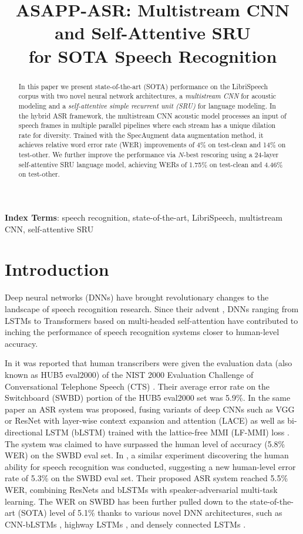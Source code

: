 \documentclass[a4paper]{article}
\title{ASAPP-ASR: Multistream CNN and Self-Attentive SRU\\for SOTA Speech Recognition}
\begin{document}
\maketitle
\begin{abstract}
In this paper we present state-of-the-art (SOTA) performance on the LibriSpeech corpus with two novel neural network architectures, a \textit{multistream CNN} for acoustic modeling and a \textit{self-attentive simple recurrent unit (SRU)} for language modeling. In the hybrid ASR framework, the multistream CNN acoustic model processes an input of speech frames in multiple parallel pipelines where each stream has a unique dilation rate for diversity. Trained with the SpecAugment data augmentation method, it achieves relative word error rate (WER) improvements of 4\% on test-clean and 14\% on test-other. We further improve the performance via $N$-best rescoring using a 24-layer self-attentive SRU language model, achieving WERs of 1.75\% on test-clean and 4.46\% on test-other.   
\end{abstract}
\noindent\textbf{Index Terms}: speech recognition, state-of-the-art, LibriSpeech, multistream CNN, self-attentive SRU

\section{Introduction}
Deep neural networks (DNNs) have brought revolutionary changes to the landscape of speech recognition research. Since their advent \cite{Hinton12}, DNNs ranging from LSTMs \cite{Hochreiter97} to Transformers based on multi-headed self-attention \cite{vaswani} have contributed to inching the performance of speech recognition systems closer to human-level accuracy. 

In \cite{Xiong16-2} it was reported that human transcribers were given the evaluation data (also known as HUB5 eval2000) of the NIST 2000 Evaluation Challenge of Conversational Telephone Speech (CTS) \cite{William00}. Their average error rate on the Switchboard (SWBD) portion of the HUB5 eval2000 set was 5.9\%. In the same paper an ASR system was proposed, fusing variants of deep CNNs such as VGG \cite{simoyan14} or ResNet \cite{He16} with layer-wise context expansion and attention (LACE) \cite{yu16} as well as bi-directional LSTM (bLSTM) trained with the lattice-free MMI (LF-MMI) loss \cite{Povey16}. The system was claimed to have surpassed the human level of accuracy (5.8\% WER) on the SWBD eval set. In \cite{Saon17}, a similar experiment discovering the human ability for speech recognition was conducted, suggesting a new human-level error rate of 5.3\% on the SWBD eval set. Their proposed ASR system reached 5.5\% WER, combining ResNets and bLSTMs with speaker-adversarial multi-task learning. The WER on SWBD has been further pulled down to the state-of-the-art (SOTA) level of 5.1\% thanks to various novel DNN architectures, such as CNN-bLSTMs \cite{Han17,Xiong17}, highway LSTMs \cite{Kurata17}, and densely connected LSTMs \cite{han18,capio}. 
\end{document}
